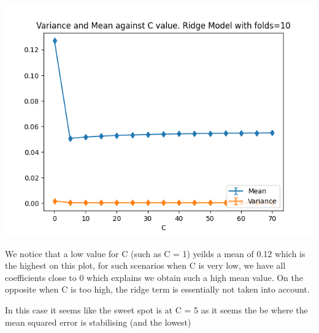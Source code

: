 \documentclass[10pt]{article}
\begin{document}
\begin{center}
    \includegraphics[scale=0.4]{Figure_11.png}
\end{center}

We notice that a low value for C (such as C = 1)
yeilds a mean of 0.12 which is the highest on this plot, for such scenarios when C is very low, 
we have all coefficients close to 0 which explains we obtain such a high mean value.
On the opposite when C is too high, the ridge term is essentially not taken into account.

In this case it seems like the sweet spot is at C = 5 as it seems the be where the
mean squared error is stabilising (and the lowest)
\end{document}
